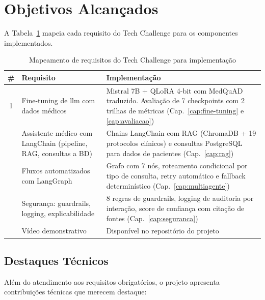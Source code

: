 \section{Objetivos Alcançados}
\label{sec:objetivos-alcancados}

A Tabela~\ref{tab:requisitos-mapeamento} mapeia cada requisito do Tech Challenge para os componentes implementados.

\begin{table}[H]
\centering
\caption{Mapeamento de requisitos do Tech Challenge para implementação}
\label{tab:requisitos-mapeamento}
\begin{tabularx}{\textwidth}{cXX}
\toprule
\textbf{\#} & \textbf{Requisito} & \textbf{Implementação} \\
\midrule
1 & Fine-tuning de \acrshort{llm} com dados médicos & Mistral 7B + QLoRA 4-bit com MedQuAD traduzido. Avaliação de 7 checkpoints com 2 trilhas de métricas (Cap.~\ref{cap:fine-tuning} e \ref{cap:avaliacao}) \\
\addlinespace
2 & Assistente médico com LangChain (pipeline, RAG, consultas a BD) & Chains LangChain com RAG (ChromaDB + 19 protocolos clínicos) e consultas PostgreSQL para dados de pacientes (Cap.~\ref{cap:rag}) \\
\addlinespace
3 & Fluxos automatizados com LangGraph & Grafo com 7 nós, roteamento condicional por tipo de consulta, retry automático e fallback determinístico (Cap.~\ref{cap:multiagente}) \\
\addlinespace
4 & Segurança: guardrails, logging, explicabilidade & 8 regras de guardrails, logging de auditoria por interação, score de confiança com citação de fontes (Cap.~\ref{cap:seguranca}) \\
\addlinespace
5 & Vídeo demonstrativo & Disponível no repositório do projeto \\
\bottomrule
\end{tabularx}
\end{table}

\subsection{Destaques Técnicos}

Além do atendimento aos requisitos obrigatórios, o projeto apresenta contribuições técnicas que merecem destaque:

